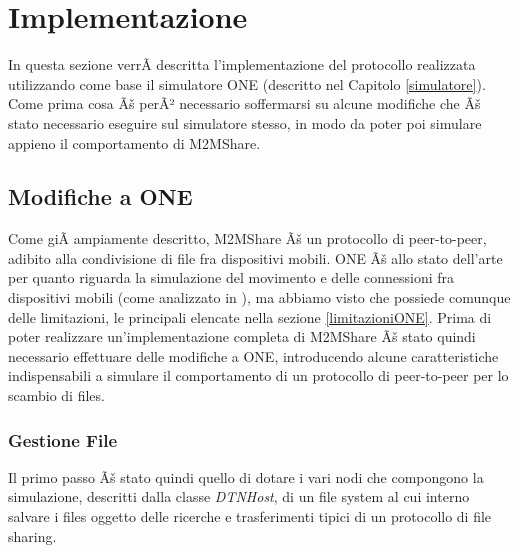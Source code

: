 
\chapter{Implementazione}\label{implementazione} %



\graphicspath{{5-Implementazione/img/}}


In questa sezione verrÃ  descritta l'implementazione del protocollo realizzata utilizzando come base il simulatore ONE (descritto nel Capitolo \ref{simulatore}). Come prima cosa Ãš perÃ² necessario soffermarsi su alcune modifiche che Ãš stato necessario eseguire sul simulatore stesso, in modo da poter poi simulare appieno il comportamento di M2MShare.

\section{Modifiche a ONE}
Come giÃ  ampiamente descritto, M2MShare Ãš un protocollo di peer-to-peer, adibito alla condivisione di file fra dispositivi mobili. ONE Ãš allo stato dell'arte per quanto riguarda la simulazione del movimento e delle connessioni fra dispositivi mobili (come analizzato in \cite{panelStateDTNEvaluation}), ma abbiamo visto che possiede comunque delle limitazioni, le principali elencate nella sezione \ref{limitazioniONE}. Prima di poter realizzare un'implementazione completa di M2MShare Ãš stato quindi necessario effettuare delle modifiche a ONE, introducendo alcune caratteristiche indispensabili a simulare il comportamento di un protocollo di peer-to-peer per lo scambio di files.

\subsection{Gestione File}
Il primo passo Ãš stato quindi quello di dotare i vari nodi che compongono la simulazione, descritti dalla classe \textit{DTNHost}, di un file system al cui interno salvare i files oggetto delle ricerche e trasferimenti tipici di un protocollo di file sharing.

